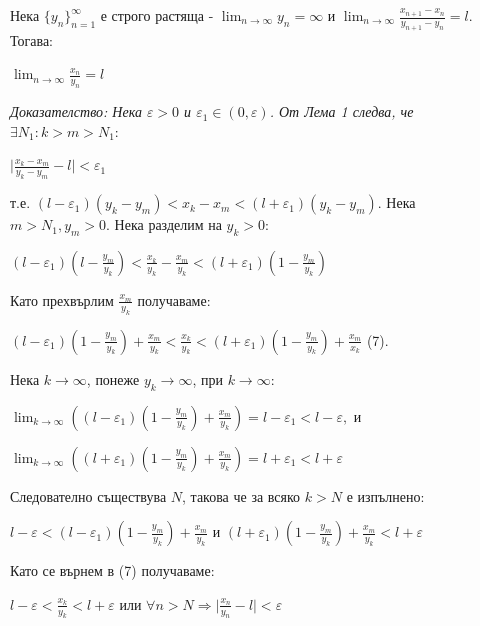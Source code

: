 \documentclass[12pt]{article}
\begin{document}
\begin{lemma3}
Нека \(\{y_n\}_{n=1}^\infty\) е строго растяща - \(\displaystyle\lim_{n \to \infty}y_n = \infty\) и \(\displaystyle\lim_{n \to \infty}\frac{x_{n+1} - x_n}{y_{n+1} - y_n} = l\). Тогава:
\begin{center}
\(\displaystyle\lim_{n \to \infty}\frac{x_n}{y_n} = l\)
\newline
\end{center}
\it{Доказателство:} Нека \(\varepsilon > 0\) и \(\varepsilon_1 \in (0, \varepsilon)\). От Лема 1 следва, че \(\exists N_1 : k > m > N_1:\)
\begin{center}
\(
    \displaystyle\lvert\frac{x_k - x_m}{y_k - y_m} - l\rvert < \varepsilon_1
\)
\end{center}
т.е. \((l - \varepsilon_1)(y_k - y_m) < x_k - x_m < (l + \varepsilon_1)(y_k - y_m)\).
Нека \(m > N_1, y_m > 0\). Нека разделим на \(y_k > 0\):
\begin{center}
\(\displaystyle(l - \varepsilon_1)(l - \frac{y_m}{y_k}) < \frac{x_k}{y_k} - \frac{x_m}{y_k} < (l + \varepsilon_1)(1 - \frac{y_m}{y_k})\)
\end{center}
Като прехвърлим \(\displaystyle\frac{x_m}{y_k}\) получаваме:
\begin{center}
\(\displaystyle(l - \varepsilon_1)(1 - \frac{y_m}{y_k}) + \frac{x_m}{y_k} < \frac{x_k}{y_k} < (l + \varepsilon_1)(1 - \frac{y_m}{y_k}) + \frac{x_m}{x_k}\) (7).
\end{center}
Нека \(k \to \infty\), понеже \(y_k \to \infty\), при \(k \to \infty\):
\begin{center}
\(
    \displaystyle\lim_{k \to \infty}((l - \varepsilon_1)(1 - \frac{y_m}{y_k}) + \frac{x_m}{y_k}) = l - \varepsilon_1 < l - \varepsilon,
\)
и
\end{center}
\begin{center}
\(
    \displaystyle\lim_{k \to \infty}((l + \varepsilon_1)(1 - \frac{y_m}{y_k}) + \frac{x_m}{y_k}) = l + \varepsilon_1 < l + \varepsilon
\)
\end{center}
Следователно съществува \(N\), такова че за всяко \(k > N\) е изпълнено:
\begin{center}
\(
    \displaystyle l - \varepsilon < (l - \varepsilon_1)(1 - \frac{y_m}{y_k}) + \frac{x_m}{y_k}
\)
и
\(
    \displaystyle(l + \varepsilon_1)(1 - \frac{y_m}{y_k}) + \frac{x_m}{y_k} < l + \varepsilon 
\)
\end{center}
Като се върнем в (7) получаваме:
\begin{center}
\(l - \varepsilon < \frac{x_k}{y_k} < l + \varepsilon\) или
\(\displaystyle\forall n > N \Rightarrow \lvert \frac{x_n}{y_n} - l \rvert < \varepsilon\)
\end{center}
\end{lemma3}
\end{document}
